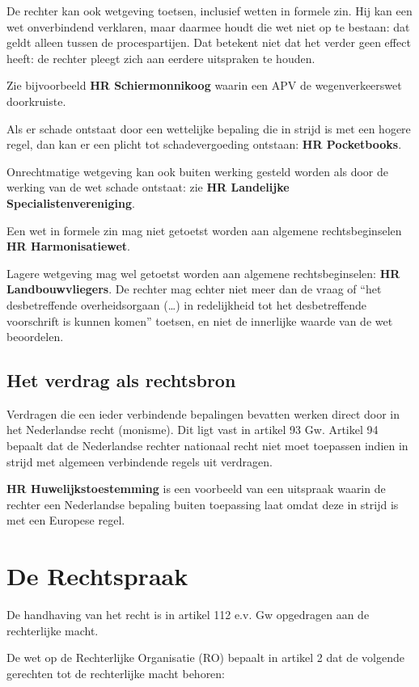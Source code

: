 \documentclass{article}
\begin{document}
De rechter kan ook wetgeving toetsen, inclusief wetten in formele zin. Hij kan
een wet onverbindend verklaren, maar daarmee houdt die wet niet op te bestaan:
dat geldt alleen tussen de procespartijen. Dat betekent niet dat het verder
geen effect heeft: de rechter pleegt zich aan eerdere uitspraken te houden.

Zie bijvoorbeeld \textbf{HR Schiermonnikoog} waarin een APV de wegenverkeerswet
doorkruiste.

Als er schade ontstaat door een wettelijke bepaling die in strijd is met een
hogere regel, dan kan er een plicht tot schadevergoeding ontstaan: \textbf{HR
Pocketbooks}.

Onrechtmatige wetgeving kan ook buiten werking gesteld worden als door de
werking van de wet schade ontstaat: zie \textbf{HR Landelijke
Specialistenvereniging}.

Een wet in formele zin mag niet getoetst worden aan algemene rechtsbeginselen
\textbf{HR Harmonisatiewet}.

Lagere wetgeving mag wel getoetst worden aan algemene rechtsbeginselen:
\textbf{HR Landbouwvliegers}. De rechter mag echter niet meer dan de vraag of
``het desbetreffende overheidsorgaan (\ldots) in redelijkheid tot het
desbetreffende voorschrift is kunnen komen'' toetsen, en niet de innerlijke
waarde van de wet beoordelen.


\subsection{Het verdrag als rechtsbron}

Verdragen die een ieder verbindende bepalingen bevatten werken direct
door in het Nederlandse recht (monisme). Dit ligt vast in artikel 93 Gw.
Artikel 94 bepaalt dat de Nederlandse rechter nationaal recht niet moet
toepassen indien in strijd met algemeen verbindende regels uit verdragen.

\textbf{HR Huwelijkstoestemming} is een voorbeeld van een uitspraak waarin de
rechter een Nederlandse bepaling buiten toepassing laat omdat deze in strijd is
met een Europese regel.

\section{De Rechtspraak}

De handhaving van het recht is in artikel 112 e.v. Gw opgedragen aan de
rechterlijke macht.

De wet op de Rechterlijke Organisatie (RO) bepaalt in artikel 2 dat de
volgende gerechten tot de rechterlijke macht behoren:
\end{document}
